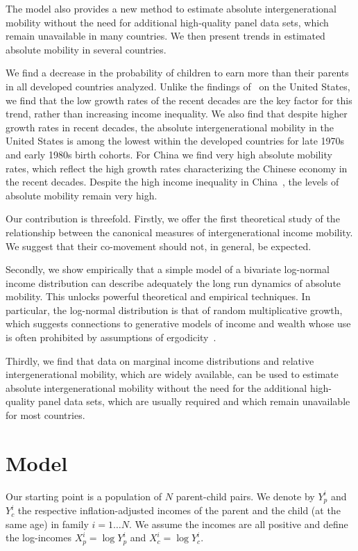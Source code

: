 \documentclass[12pt,a4paper]{article}
\numberwithin{equation}{section}
\begin{document}
The model also provides a new method to estimate absolute intergenerational mobility without the need for additional high-quality panel data sets, which remain unavailable in many countries. We then present trends in estimated absolute mobility in several countries.

We find a decrease in the probability of children to earn more than their parents in all developed countries analyzed. Unlike the findings of~\citet{chetty2017fading} on the United States, we find that the low growth rates of the recent decades are the key factor for this trend, rather than increasing income inequality. We also find that despite higher growth rates in recent decades, the absolute intergenerational mobility in the United States is among the lowest within the developed countries for late 1970s and early 1980s birth cohorts. For China we find very high absolute mobility rates, which reflect the high growth rates characterizing the Chinese economy in the recent decades. Despite the high income inequality in China~\citep{piketty2017capital}, the levels of absolute mobility remain very high.

Our contribution is threefold. Firstly, we offer the first theoretical study of the relationship between the canonical measures of intergenerational income mobility. We suggest that their co-movement should not, in general, be expected.

Secondly, we show empirically that a simple model of a bivariate log-normal income distribution can describe adequately the long run dynamics of absolute mobility. This unlocks powerful theoretical and empirical techniques. In particular, the log-normal distribution is that of random multiplicative growth, which suggests connections to generative models of income and wealth whose use is often prohibited by assumptions of ergodicity~\citep{adamou2016,berman2016far}.

Thirdly, we find that data on marginal income distributions and relative intergenerational mobility, which are widely available, can be used to estimate absolute intergenerational mobility without the need for the additional high-quality panel data sets, which are usually required and which remain unavailable for most countries.

\section{Model}

Our starting point is a population of $N$ parent-child pairs. We denote by $Y_p^i$ and $Y_c^i$ the respective inflation-adjusted incomes of the parent and the child (at the same age) in family $i=1\dots N$. We assume the incomes are all positive and define the log-incomes $X_p^i=\log Y_p^i$ and $X_c^i=\log Y_c^i$.
\end{document}
